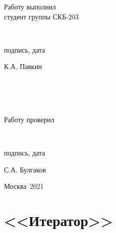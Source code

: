 \documentclass[a4paper,12pt]{article}
\begin{document}
\begin{titlepage}
\begin{flushright}
	\begin{minipage}[center]{15cm}
		\begin{minipage}[left]{5cm}
			{Работу выполнил\\студент группы СКБ-203}
		\end{minipage}
		\begin{minipage}[center]{5cm}
			\vspace{1.25cm}
			\hrulefill\\[-1cm]
			\begin{center}{подпись, дата}\end{center}
		\end{minipage}
		\begin{minipage}[right]{4cm}
			\vspace{0.4cm}
			\begin{flushright}{К.А. Павкин}\end{flushright}
		\end{minipage}
		\\
		\\
		\\
		\begin{minipage}[left]{5cm}
			{Работу проверил}
		\end{minipage}
		\begin{minipage}[center]{5cm}
			\vspace{1.25cm}
			\hrulefill\\[-1cm]
			\begin{center}{подпись, дата}\end{center}
		\end{minipage}
		\begin{minipage}[right]{4cm}
			\begin{flushright}{С.А. Булгаков}\end{flushright}
		\end{minipage}
	\end{minipage}
\end{flushright}

\vspace{\fill}

\begin{center}
	Москва~2021
\end{center}

\end{titlepage}

\tableofcontents
\thispagestyle{empty}
\cleardoublepage

\section*{<<Итератор>>}
\end{document}
